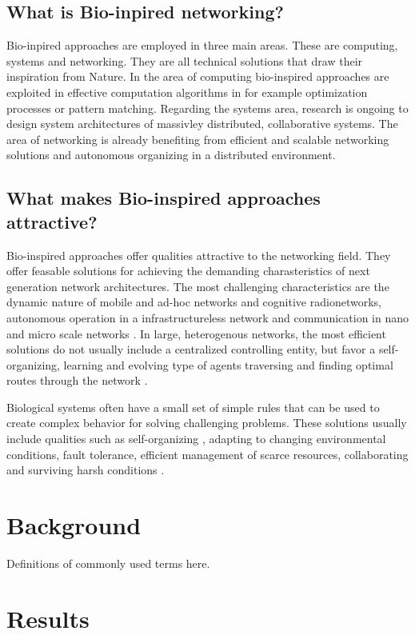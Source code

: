 \documentclass{IWORK2014}
\begin{document}
\subsection{What is Bio-inpired networking?}
Bio-inpired approaches are employed in three main areas. These are computing, systems and networking. They are all technical solutions that draw their inspiration from Nature. In the area of computing bio-inspired approaches are exploited in effective computation algorithms in for example optimization processes or pattern matching. Regarding the systems area, research is ongoing to design system architectures of massivley distributed, collaborative systems. The area of networking is already benefiting from efficient and scalable networking solutions and autonomous organizing in a distributed environment. \cite{dressler2010bio}

\subsection{What makes Bio-inspired approaches attractive?} 
Bio-inspired approaches offer qualities attractive to the networking field. They offer feasable solutions for achieving the demanding charasteristics of next generation network architectures. The most challenging characteristics are the dynamic nature of mobile and ad-hoc networks and cognitive radionetworks, autonomous operation in a infrastructureless network and communication in nano and micro scale networks \cite{dressler2010bio}. In large, heterogenous networks, the most efficient solutions do not usually include a centralized controlling entity, but favor a self-organizing, learning and evolving type of agents traversing and finding optimal routes through the network \cite{dressler2010bio}.

Biological systems often have a small set of simple rules that can be used to create complex behavior \cite{dressler2010bio} for solving challenging problems. These solutions usually include qualities such as self-organizing \cite{kroeker2011biology}, adapting to changing environmental conditions, fault tolerance, efficient management of scarce resources, collaborating and surviving harsh conditions \cite{dressler2010bio}.

\section{Background}
Definitions of commonly used terms here.

\section{Results}
\end{document}
